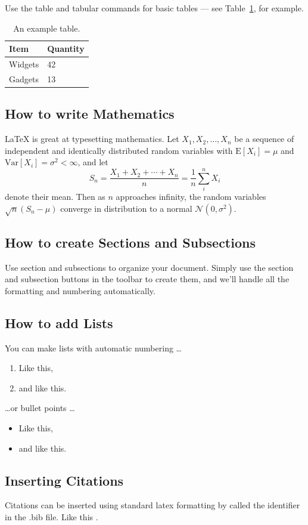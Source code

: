 \documentclass[a4paper]{article}
\begin{document}
Use the table and tabular commands for basic tables --- see Table~\ref{tab:widgets}, for example.

\begin{table}
\centering
\begin{tabular}{@{}l l@{}}
\toprule
Item & Quantity \\
\midrule
Widgets & 42 \\
Gadgets & 13 \\
\bottomrule
\end{tabular}
\caption{\label{tab:widgets}An example table.}
\end{table}

\subsection{How to write Mathematics}

\LaTeX{} is great at typesetting mathematics. Let $X_1, X_2, \ldots, X_n$ be a sequence of independent and identically distributed random variables with $\text{E}[X_i] = \mu$ and $\text{Var}[X_i] = \sigma^2 < \infty$, and let
\[S_n = \frac{X_1 + X_2 + \cdots + X_n}{n}
      = \frac{1}{n}\sum_{i}^{n} X_i\]
denote their mean. Then as $n$ approaches infinity, the random variables $\sqrt{n}(S_n - \mu)$ converge in distribution to a normal $\mathcal{N}(0, \sigma^2)$.


\subsection{How to create Sections and Subsections}

Use section and subsections to organize your document. Simply use the section and subsection buttons in the toolbar to create them, and we'll handle all the formatting and numbering automatically.

\subsection{How to add Lists}

You can make lists with automatic numbering \dots

\begin{enumerate}
\item Like this,
\item and like this.
\end{enumerate}
\dots or bullet points \dots
\begin{itemize}
\item Like this,
\item and like this.
\end{itemize}

\subsection{Inserting Citations}
Citations can be inserted using standard latex formatting by called the identifier in the .bib file. Like this \citep{einstein1935can,Kucsko2013}.



\end{document}
